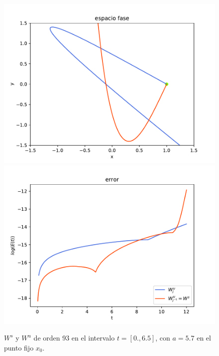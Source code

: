 \documentclass[11pt]{beamer}
\theoremstyle{definition}
\begin{document}
\begin{frame}
\begin{figure}[H]
	\centering
	\includegraphics[scale=0.35]{jung57}
	\includegraphics[scale=0.35]{error_jung57}
	\caption{$W^{s}$ y $W^{u}$ de orden 93 en el intervalo $t=[0.,6.5]$, con $a=5.7$ en el punto fijo $x_{0}$.}
	\label{jung2}
\end{figure}

\end{frame}
\end{document}
